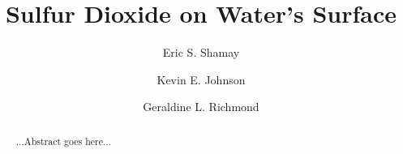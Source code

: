 \documentclass{article}
\title{Sulfur Dioxide on Water's Surface}
\author{Eric S. Shamay \and Kevin E. Johnson \and Geraldine L. Richmond}
\begin{document}
\newcommand{\suldiox}{SO$_2$}
\newcommand{\ang}{\,$\textrm{\AA}$}
\newcommand{\angs}{\ang}
\newcommand{\wat}{H$_2$O}

\maketitle

\onehalfspacing


\begin{abstract}
	...Abstract goes here...
\end{abstract}










\end{document}
